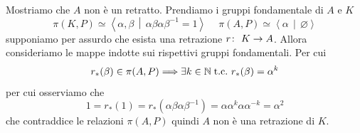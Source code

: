 \begin{example}
\begin{enumerate}
		Mostriamo che $A$ non è un retratto. Prendiamo i gruppi fondamentale di $A$ e $K$ 
		\begin{equation*}
			\pi(K, P) \simeq \left\langle \alpha, \beta \,\middle|\, \alpha\beta\alpha\beta^{-1} = 1 \right\rangle \quad\ \pi(A, P) \simeq \left\langle \alpha \,\middle|\, \varnothing \right\rangle
		\end{equation*}
		supponiamo per assurdo che esista una retrazione $r \colon\ K \rightarrow A$. Allora consideriamo le mappe indotte sui rispettivi gruppi fondamentali. Per cui
		\begin{equation*}
			r_*(\beta) \in \pi(A, P) \Longrightarrow \exists k \in \mathbb{N} \; \text{t.c.}\ r_*(\beta) = \alpha^k
		\end{equation*}
		per cui osserviamo che 
		\begin{equation*}
			 1 = r_*(1) = r_*(\alpha\beta\alpha\beta^{-1}) = \alpha\alpha^k\alpha\alpha^{-k} = \alpha^2
		\end{equation*}
		che contraddice le relazioni $\pi(A, P)$ quindi $A$ non è una retrazione di $K$. 		
	\end{enumerate}
\end{example}
